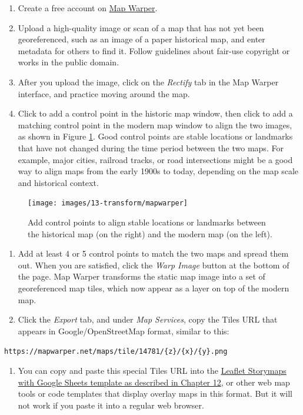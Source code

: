 \documentclass[
  english,
]{book}
\providecommand{\tightlist}{%
  \setlength{\itemsep}{0pt}\setlength{\parskip}{0pt}}
\begin{document}
\begin{enumerate}
\def\labelenumi{\arabic{enumi}.}
\item
  Create a free account on \href{https://mapwarper.net}{Map Warper}.
\item
  Upload a high-quality image or scan of a map that has not yet been georeferenced, such as an image of a paper historical map, and enter metadata for others to find it. Follow guidelines about fair-use copyright or works in the public domain.
\item
  After you upload the image, click on the \emph{Rectify} tab in the Map Warper interface, and practice moving around the map.
\item
  Click to add a control point in the historic map window, then click to add a matching control point in the modern map window to align the two images, as shown in Figure \ref{fig:mapwarper}. Good control points are stable locations or landmarks that have not changed during the time period between the two maps. For example, major cities, railroad tracks, or road intersections might be a good way to align maps from the early 1900s to today, depending on the map scale and historical context.
\end{enumerate}



\begin{figure}
\texttt{[image: images/13-transform/mapwarper]} \caption{Add control points to align stable locations or landmarks between the historical map (on the right) and the modern map (on the left).}\label{fig:mapwarper}
\end{figure}

\begin{enumerate}
\def\labelenumi{\arabic{enumi}.}
\setcounter{enumi}{4}
\item
  Add at least 4 or 5 control points to match the two maps and spread them out. When you are satisfied, click the \emph{Warp Image} button at the bottom of the page. Map Warper transforms the static map image into a set of georeferenced map tiles, which now appear as a layer on top of the modern map.
\item
  Click the \emph{Export} tab, and under \emph{Map Services}, copy the Tiles URL that appears in Google/OpenStreetMap format, similar to this:
\end{enumerate}

\texttt{https://mapwarper.net/maps/tile/14781/\{z\}/\{x\}/\{y\}.png}

\begin{enumerate}
\def\labelenumi{\arabic{enumi}.}
\setcounter{enumi}{6}
\tightlist
\item
  You can copy and paste this special Tiles URL into the \href{leaflet-storymaps-with-google-sheets.html}{Leaflet Storymaps with Google Sheets template as described in Chapter 12}, or other web map tools or code templates that display overlay maps in this format. But it will not work if you paste it into a regular web browser.
\end{enumerate}
\end{document}
